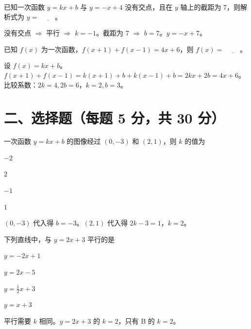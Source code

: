 \documentclass{exam-zh}
\begin{document}
\begin{question}[points=5]
  已知一次函数 $y = kx + b$ 与 $y = -x + 4$ 没有交点，且在 $y$ 轴上的截距为 $7$，则解析式为 $y = $ $\underline{\quad\quad}$。
  \fillin
  \paren[$-x + 7$]
  \begin{solutionblock}
    没有交点 $\Rightarrow$ 平行 $\Rightarrow$ $k = -1$。截距为 $7$ $\Rightarrow$ $b = 7$。$y = -x + 7$。
  \end{solutionblock}
\end{question}



\begin{question}[points=5]
  已知 $f(x)$ 为一次函数，$f(x + 1) + f(x - 1) = 4x + 6$，则 $f(x) = $ $\underline{\quad\quad}$。
  \fillin
  \paren[$2x + 3$]
  \begin{solutionblock}
    设 $f(x) = kx + b$。$f(x+1) + f(x-1) = k(x+1)+b + k(x-1)+b = 2kx + 2b = 4x + 6$。比较系数：$2k = 4, 2b = 6$，$k = 2, b = 3$。
  \end{solutionblock}
\end{question}


\section*{二、选择题（每题 5 分，共 30 分）}


\begin{question}[points=5]
  一次函数 $y = kx + b$ 的图像经过 $(0, -3)$ 和 $(2, 1)$，则 $k$ 的值为
  \begin{choices}
    \item $-2$
    \item $2$
    \item $-1$
    \item $1$
  \end{choices}
  \paren[B]
  \begin{solutionblock}
    $(0, -3)$ 代入得 $b = -3$。$(2, 1)$ 代入得 $2k - 3 = 1$，$k = 2$。
  \end{solutionblock}
\end{question}



\begin{question}[points=5]
  下列直线中，与 $y = 2x + 3$ 平行的是
  \begin{choices}
    \item $y = -2x + 1$
    \item $y = 2x - 5$
    \item $y = \frac{1}{2}x + 3$
    \item $y = x + 3$
  \end{choices}
  \paren[B]
  \begin{solutionblock}
    平行需要 $k$ 相同。$y = 2x + 3$ 的 $k = 2$，只有 B 的 $k = 2$。
  \end{solutionblock}
\end{question}
\end{document}

